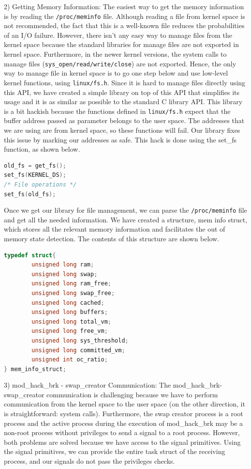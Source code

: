 2) Getting Memory Information: The easiest way to get the memory information is by
reading the \texttt{/proc/meminfo} file. Although reading a file from kernel space
is not recommended, the fact that this is a well-known file reduces the probabilities
of an I/O failure. However, there isn’t any easy way to manage files from the kernel
space because the standard libraries for manage files are not exported in kernel
space. Furthermore, in the newer kernel versions, the system calls to manage files
(\texttt{sys\_{open/read/write/close}}) are not exported. Hence, the only way to
manage file in kernel space is to go one step below and use low-level kernel functions,
using \texttt{linux/fs.h}. Since it is hard to manage files directly using this API,
we have created a simple library on top of this API that simplifies its usage and
it is as similar as possible to the standard C library API. This library is a bit
hackish because the functions defined in \texttt{linux/fs.h} expect that the buffer
address passed as parameter belongs to the user space. The addresses that we are
using are from kernel space, so these functions will fail. Our library fixes this
issue by marking our addresses as safe. This hack is done using the set\_fs function,
as shown below.

\begin{lstlisting}[language=C]
old_fs = get_fs();
set_fs(KERNEL_DS);
/* File operations */
set_fs(old_fs);
\end{lstlisting}

Once we get our library for file management, we can parse the \texttt{/proc/meminfo}
file and get all the needed information. We have created a structure, mem info
struct, which stores all the relevant memory information and facilitates the out
of memory state detection. The contents of this structure are shown below.

\begin{lstlisting}[language=C]
typedef struct{
        unsigned long ram;
        unsigned long swap;
        unsigned long ram_free;
        unsigned long swap_free;
        unsigned long cached;
        unsigned long buffers;
        unsigned long total_vm;
        unsigned long free_vm;
        unsigned long sys_threshold;
        unsigned long committed_vm;
        unsigned int oc_ratio;
} mem_info_struct;
\end{lstlisting}

3) mod\_hack\_brk - swap\_creator Communication: The mod\_hack\_brk-swap\_creator
communication is challenging because we have to perform communication from the
kernel space to the user space (on the other direction, it is straightforward: system
calls). Furthermore, the swap creator process is a root process and the active
process during the execution of mod\_hack\_brk may be a non-root process without
privileges to send a signal to a root process. However, both problems are solved
because we have access to the signal primitives. Using the signal primitives, we
can provide the entire task struct of the receiving process, and our signals do not
pass the privileges checks.

